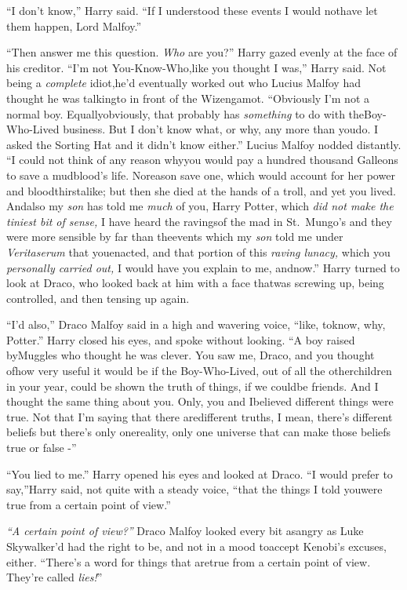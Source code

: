 ``I don't know,'' Harry said. ``If I understood these events I would nothave let them happen, Lord Malfoy.''

``Then answer me this question. \emph{Who} are you?''
Harry gazed evenly at the face of his creditor. ``I'm not You-Know-Who,like you thought I was,'' Harry said. Not being a \emph{complete} idiot,he'd eventually worked out who Lucius Malfoy had thought he was talkingto in front of the Wizengamot. ``Obviously I'm not a normal boy. Equallyobviously, that probably has \emph{something} to do with theBoy-Who-Lived business. But I don't know what, or why, any more than youdo. I asked the Sorting Hat and it didn't know either.''
Lucius Malfoy nodded distantly. ``I could not think of any reason whyyou would pay a hundred thousand Galleons to save a mudblood's life. Noreason save one, which would account for her power and bloodthirstalike; but then she died at the hands of a troll, and yet you lived. Andalso my \emph{son} has told me \emph{much} of you, Harry Potter, which
\emph{did not make the tiniest bit of sense,} I have heard the ravingsof the mad in St.~Mungo's and they were more sensible by far than theevents which my \emph{son} told me under \emph{Veritaserum} that youenacted, and that portion of this \emph{raving lunacy,} which you
\emph{personally carried out,} I would have you explain to me, andnow.''
Harry turned to look at Draco, who looked back at him with a face thatwas screwing up, being controlled, and then tensing up again.

``I'd also,'' Draco Malfoy said in a high and wavering voice, ``like, toknow, why, Potter.''
Harry closed his eyes, and spoke without looking. ``A boy raised byMuggles who thought he was clever. You saw me, Draco, and you thought ofhow very useful it would be if the Boy-Who-Lived, out of all the otherchildren in your year, could be shown the truth of things, if we couldbe friends. And I thought the same thing about you. Only, you and Ibelieved different things were true. Not that I'm saying that there aredifferent truths, I mean, there's different beliefs but there's only onereality, only one universe that can make those beliefs true or false -''

``You lied to me.''
Harry opened his eyes and looked at Draco. ``I would prefer to say,''Harry said, not quite with a steady voice, ``that the things I told youwere true from a certain point of view.''

\emph{``A certain point of view?''} Draco Malfoy looked every bit asangry as Luke Skywalker'd had the right to be, and not in a mood toaccept Kenobi's excuses, either. ``There's a word for things that aretrue from a certain point of view. They're called \emph{lies!}''

